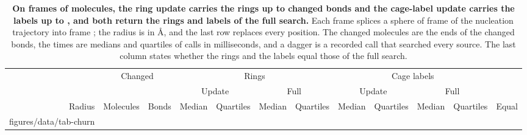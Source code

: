 \documentclass[preprint,12pt]{elsarticle}
\makeatletter
\newcommand{\tabbody}[1]{\@@input #1 }
\makeatother
\begin{document}
\begin{table}
\centering
\caption{\textbf{On frames of  molecules, the ring update carries the rings up to  changed bonds and the cage-label update carries the labels up to , and both return the rings and labels of the full search.}
Each frame splices a sphere of frame  of the nucleation trajectory into frame ; the radius is in \unit{\angstrom}, and the last row replaces every position.
The changed molecules are the ends of the changed bonds, the times are medians and quartiles of  calls in milliseconds, and a dagger is a recorded call that searched every source.
The last column states whether the rings and the labels equal those of the full search.}
\label{tab:s-churn}
\footnotesize
\setlength{\tabcolsep}{4pt}
\begin{tabular}{@{}rrrrcrcrcrcc@{}}
\toprule
 & \multicolumn{2}{c}{Changed} & \multicolumn{4}{c}{Rings} & \multicolumn{4}{c}{Cage labels} & \\
\cmidrule(lr){2-3}\cmidrule(lr){4-7}\cmidrule(lr){8-11}
 & & & \multicolumn{2}{c}{Update} & \multicolumn{2}{c}{Full} & \multicolumn{2}{c}{Update} & \multicolumn{2}{c}{Full} & \\
\cmidrule(lr){4-5}\cmidrule(lr){6-7}\cmidrule(lr){8-9}\cmidrule(lr){10-11}
Radius & Molecules & Bonds & Median & Quartiles & Median & Quartiles & Median & Quartiles & Median & Quartiles & Equal \\
\midrule
\tabbody{figures/data/tab-churn}
\bottomrule
\end{tabular}


\end{table}
\end{document}
